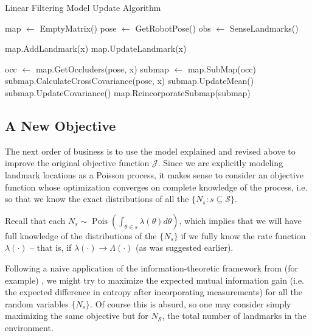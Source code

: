 \documentclass[12pt]{article}
\DeclareMathOperator{\Pois}{Pois}
\begin{document}
\begin{algorithm}[H]
  \caption{Linear Filtering Model Update Algorithm}
  \label{linear_update_algorithm}
  \begin{algorithmic}
    \STATE map $\leftarrow$ EmptyMatrix()
      \STATE pose $\leftarrow$ GetRobotPose()
      \STATE obs $\leftarrow$ SenseLandmarks()

          \STATE map.AddLandmark(x)
        \ELSE
          \STATE map.UpdateLandmark(x)
        \ENDIF
          
        \STATE occ $\leftarrow$ map.GetOccluders(pose, x)
          \STATE submap $\leftarrow$ map.SubMap(occ)
          \STATE submap.CalculateCrossCovariance(pose, x)
          \STATE submap.UpdateMean()
          \STATE submap.UpdateCovariance()
          \STATE map.ReincorporateSubmap(submap)
        \ENDIF
      \ENDFOR
    \ENDWHILE
  \end{algorithmic}
\end{algorithm}

\subsection{A New Objective}

The next order of business is to use the model explained and revised above to improve the original objective function $\mathcal{J}$. Since we are explicitly modeling landmark locations as a Poisson process, it makes sense to consider an objective function whose optimization converges on complete knowledge of the process, i.e. so that we know the exact distributions of all the $\{N_s : s \subseteq \mathcal{S}\}$.

Recall that each $N_s \sim \Pois \left( \int_{\theta \in s} \lambda(\theta) d\theta \right)$, which implies that we will have full knowledge of the distributions of the $\{N_s\}$ if we fully know the rate function $\lambda(\cdot)$ -- that is, if $\lambda(\cdot) \rightarrow \Lambda(\cdot)$ (as was suggested earlier).

Following a naive application of the information-theoretic framework from (for example) \cite{bourgault}, we might try to maximize the expected mutual information gain (i.e. the expected difference in entropy after incorporating measurements) for all the random variables $\{N_s\}$. Of course this is absurd, so one may consider simply maximizing the same objective but for $N_{\mathcal{S}}$, the total number of landmarks in the environment.
\end{document}
